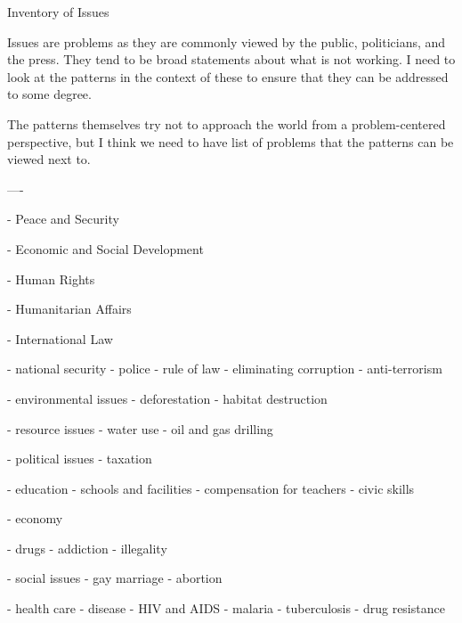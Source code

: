 Inventory of Issues

Issues are problems as they are commonly viewed by the public, politicians, and the press. They tend to be broad statements about what is not working. I need to look at the patterns in the context of these to ensure that they can be addressed to some degree.

The patterns themselves try not to approach the world from a problem-centered perspective, but I think we need to have  list of problems that the patterns can be viewed next to.

----

- Peace and Security

- Economic and Social Development

- Human Rights

- Humanitarian Affairs

- International Law



- national security
	- police
	- rule of law
		- eliminating corruption
	- anti-terrorism
	
- environmental issues
	- deforestation
	- habitat destruction

- resource issues
	- water use
	- oil and gas drilling

- political issues
	- taxation
	
- education
	- schools and facilities
	- compensation for teachers
	- civic skills

- economy

- drugs
	- addiction
	- illegality

- social issues
	- gay marriage
	- abortion

- health care
	- disease
		- HIV and AIDS
		- malaria
		- tuberculosis
		- drug resistance